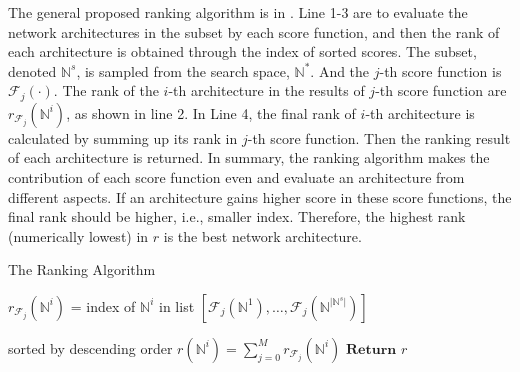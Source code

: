 \documentclass[sigconf]{acmart}
\begin{document}
    The general proposed ranking algorithm is in . 
    Line 1-3 are to evaluate the network architectures in the subset 
    by each score function, and then the rank of each architecture is 
    obtained through the index of sorted scores. The subset, denoted 
    $\mathbb N^s$, is sampled from the search space, $\mathbb N^*$. And 
    the $j$-th score function is $\mathcal F_j(\cdot)$. The rank of the 
    $i$-th architecture in the results of $j$-th score function are 
    $r_{\mathcal F_j}(\mathbb N^i)$, as shown in line 2. In Line 4, 
    the final rank of $i$-th architecture is calculated by summing up 
    its rank in $j$-th score function. Then the ranking result of each 
    architecture is returned. In summary, the ranking algorithm makes the 
    contribution of each score function even and evaluate an architecture 
    from different aspects. If an architecture gains higher score in these 
    score functions, the final rank should be higher, i.e., smaller index. 
    Therefore, the highest rank (numerically lowest) in $r$ is the best 
    network architecture. 

    \begin{algorithm}[h]
        \caption{The Ranking Algorithm}\label{alg:rank-based}
        \begin{algorithmic}[1]
                \State $r_{{\mathcal F}_{j}}({\mathbb N}^i)$ = index of ${\mathbb N}^i$ in list $[{\mathcal F}_{j}({\mathbb N}^1),\ldots,{\mathcal F}_{j}({\mathbb N}^{\lvert {\mathbb N}^s\rvert})]$ \par sorted by descending order
            \EndFor
            \State $r({\mathbb N}^i)=\sum^M_{j=0} r_{{\mathcal F}_{j}}({\mathbb N}^i)$
            \State $\textbf{Return }r$
        \end{algorithmic}
    \end{algorithm}
\end{document}
